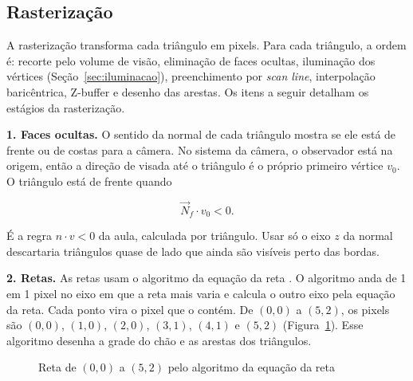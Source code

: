 \subsection{Rasterização}\label{sec:rasterizacao}

A rasterização transforma cada triângulo em pixels. Para cada triângulo, a ordem é: recorte pelo
volume de visão, eliminação de faces ocultas, iluminação dos vértices
(Seção~\ref{sec:iluminacao}), preenchimento por \textit{scan line}, interpolação baricêntrica,
Z-buffer e desenho das arestas. Os itens a seguir detalham os estágios da rasterização.

\textbf{1. Faces ocultas.} O sentido da normal de cada triângulo mostra se ele está de frente ou de
costas para a câmera. No sistema da câmera, o observador está na origem, então a direção de visada
até o triângulo é o próprio primeiro vértice $v_0$. O triângulo está de frente quando

\begin{equation}
  \vec{N}_f \cdot v_0 < 0 .
\end{equation}

É a regra $n \cdot v < 0$ da aula, calculada por triângulo. Usar só o eixo $z$ da normal
descartaria triângulos quase de lado que ainda são visíveis perto das bordas.

\textbf{2. Retas.} As retas usam o algoritmo da equação da reta \cite[seção 5.2.1]{azevedo2018}.
 O algoritmo anda de 1 em 1 pixel no
eixo em que a reta mais varia e calcula o outro eixo pela equação da reta. Cada ponto vira o pixel
que o contém. De $(0,0)$ a $(5,2)$, os pixels são $(0,0)$, $(1,0)$, $(2,0)$, $(3,1)$, $(4,1)$ e
$(5,2)$ (Figura~\ref{fig:reta-pixels}). Esse algoritmo desenha a grade do chão e as arestas dos
triângulos.

\begin{figure}[H]
  \centering
  \caption{Reta de $(0,0)$ a $(5,2)$ pelo algoritmo da equação da reta}\label{fig:reta-pixels}
\end{figure}

